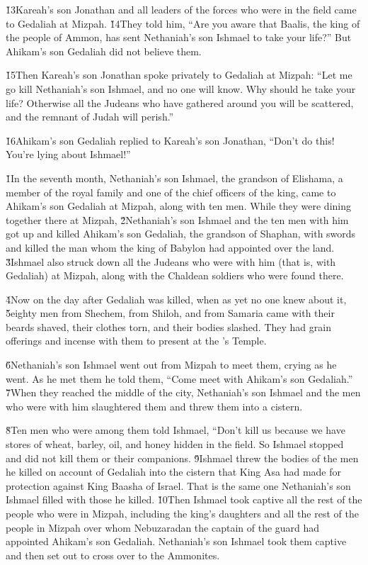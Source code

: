 \v{13}Kareah's son Jonathan and all leaders of the forces who were in the field came to Gedaliah at Mizpah. \v{14}They told him, ``Are you aware that Baalis, the king of the people of Ammon, has sent Nethaniah's son Ishmael to take your life?'' But Ahikam's son Gedaliah did not believe them.

\v{15}Then Kareah's son Jonathan spoke privately to Gedaliah at Mizpah: ``Let me go kill Nethaniah's son Ishmael, and no one will know. Why should he take your life? Otherwise all the Judeans who have gathered around you will be scattered, and the remnant of Judah will perish.''

\v{16}Ahikam's son Gedaliah replied to Kareah's son Jonathan, ``Don't do this! You're lying about Ishmael!''

\v{1}In the seventh month, Nethaniah's son Ishmael, the grandson of Elishama, a member of the royal family and one of the chief officers of the king, came to Ahikam's son Gedaliah at Mizpah, along with ten men. While they were dining together there at Mizpah, \v{2}Nethaniah's son Ishmael and the ten men with him got up and killed Ahikam's son Gedaliah, the grandson of Shaphan, with swords and killed the man whom the king of Babylon had appointed over the land. \v{3}Ishmael also struck down all the Judeans who were with him (that is, with Gedaliah) at Mizpah, along with the Chaldean soldiers who were found there.

\v{4}Now on the day after Gedaliah was killed, when as yet no one knew about it, \v{5}eighty men from Shechem, from Shiloh, and from Samaria came with their beards shaved, their clothes torn, and their bodies slashed. They had grain offerings and incense with them to present at the 's Temple.

\v{6}Nethaniah's son Ishmael went out from Mizpah to meet them, crying as he went. As he met them he told them, ``Come meet with Ahikam's son Gedaliah.'' \v{7}When they reached the middle of the city, Nethaniah's son Ishmael and the men who were with him slaughtered them and threw them into a cistern.

\v{8}Ten men who were among them told Ishmael, ``Don't kill us because we have stores of wheat, barley, oil, and honey hidden in the field. So Ishmael stopped and did not kill them or their companions. \v{9}Ishmael threw the bodies of the men he killed on account of Gedaliah into the cistern that King Asa had made for protection against King Baasha of Israel. That is the same one Nethaniah's son Ishmael filled with those he killed. \v{10}Then Ishmael took captive all the rest of the people who were in Mizpah, including the king's daughters and all the rest of the people in Mizpah over whom Nebuzaradan the captain of the guard had appointed Ahikam's son Gedaliah. Nethaniah's son Ishmael took them captive and then set out to cross over to the Ammonites.

